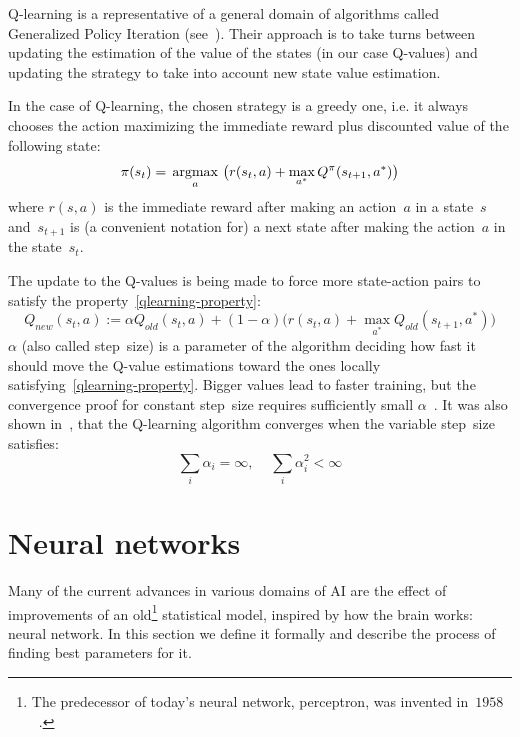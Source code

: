 Q-learning is a representative of a general domain of algorithms called Generalized Policy Iteration (see~\cite[Chapter~4.6.]{reinforcement-book}). Their approach is to take turns between updating the estimation of the value of the states (in our case Q-values) and updating the strategy to take into account new state value estimation.
 
In the case of Q-learning, the chosen strategy is a greedy one, i.e. it always chooses the action maximizing the immediate reward plus discounted value of the following state:
\begin{equation}
  \pi(s_t) = \operatorname*{\,\operatorname{argmax}\,}_a \big(r(s_t, a) + \max_{a^*} Q^\pi(s_{t+1}, a^*)\big)
\end{equation}
where $r(s, a)$ is the immediate reward after making an action~$a$ in a state~$s$ and~$s_{t+1}$ is (a convenient notation for) a next state after making the action~$a$ in the state~$s_t$.

The update to the Q-values is being made to force more state-action pairs to satisfy the property~\eqref{qlearning-property}:
\begin{equation}
  Q_{new}(s_t, a) := \alpha Q_{old}(s_t, a) + (1 - \alpha)\big(r(s_t, a) + \max_{a^*} Q_{old}(s_{t+1}, a^*)\big)
\end{equation}
$\alpha$ (also called step~size) is a parameter of the algorithm deciding how fast it should move the Q-value estimations toward the ones locally satisfying~\eqref{qlearning-property}. Bigger values lead to faster training, but the convergence proof for constant step~size requires sufficiently small $\alpha$~\cite[section~3.]{qlearning-old}. It was also shown in~\cite{qlearning-convergence}, that the Q-learning algorithm converges when the variable step~size satisfies:
\begin{equation}
  \sum_i \alpha_i = \infty, \;\;\;\; \sum_i \alpha_i^2 < \infty
\end{equation}


\section{Neural networks}
Many of the current advances in various domains of AI are the effect of improvements of an old\footnote{The predecessor of today's neural network, perceptron, was invented in~$1958$~\cite{perceptron}.} statistical model, inspired by how the brain works: neural network. In this section we define it formally and describe the process of finding best parameters for it.

